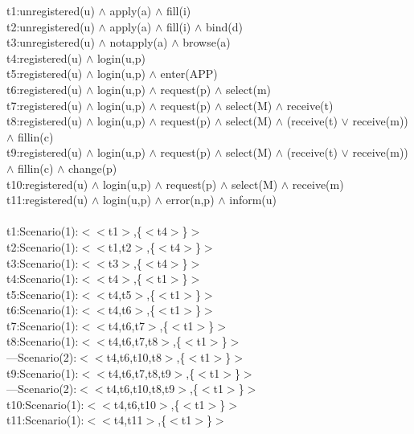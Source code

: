 \documentclass[runningheads]{llncs}
\begin{document}
t1:unregistered(u) $\wedge$ apply(a) $\wedge$ fill(i)\\
t2:unregistered(u) $\wedge$ apply(a) $\wedge$ fill(i) $\wedge$ bind(d)\\
t3:unregistered(u) $\wedge$ notapply(a) $\wedge$ browse(a)\\
t4:registered(u) $\wedge$ login(u,p)\\
t5:registered(u) $\wedge$ login(u,p) $\wedge$ enter(APP)\\
t6:registered(u) $\wedge$ login(u,p) $\wedge$ request(p) $\wedge$ select(m)\\
t7:registered(u) $\wedge$ login(u,p) $\wedge$ request(p) $\wedge$ select(M) $\wedge$ receive(t)\\
t8:registered(u) $\wedge$ login(u,p) $\wedge$ request(p) $\wedge$ select(M) $\wedge$ (receive(t) $\vee$ receive(m)) $\wedge$ fillin(c)\\
t9:registered(u) $\wedge$ login(u,p) $\wedge$ request(p) $\wedge$ select(M) $\wedge$ (receive(t) $\vee$ receive(m)) $\wedge$ fillin(c) $\wedge$ change(p)\\
t10:registered(u) $\wedge$ login(u,p) $\wedge$ request(p) $\wedge$ select(M) $\wedge$ receive(m)\\
t11:registered(u) $\wedge$ login(u,p) $\wedge$ error(n,p) $\wedge$ inform(u)\\
\\
t1:Scenario(1):$<$$<$t1$>$,\{$<$t4$>$\}$>$\\
t2:Scenario(1):$<$$<$t1,t2$>$,\{$<$t4$>$\}$>$\\
t3:Scenario(1):$<$$<$t3$>$,\{$<$t4$>$\}$>$\\
t4:Scenario(1):$<$$<$t4$>$,\{$<$t1$>$\}$>$\\
t5:Scenario(1):$<$$<$t4,t5$>$,\{$<$t1$>$\}$>$\\
t6:Scenario(1):$<$$<$t4,t6$>$,\{$<$t1$>$\}$>$\\
t7:Scenario(1):$<$$<$t4,t6,t7$>$,\{$<$t1$>$\}$>$\\
t8:Scenario(1):$<$$<$t4,t6,t7,t8$>$,\{$<$t1$>$\}$>$\\
---Scenario(2):$<$$<$t4,t6,t10,t8$>$,\{$<$t1$>$\}$>$\\
t9:Scenario(1):$<$$<$t4,t6,t7,t8,t9$>$,\{$<$t1$>$\}$>$\\
---Scenario(2):$<$$<$t4,t6,t10,t8,t9$>$,\{$<$t1$>$\}$>$\\
t10:Scenario(1):$<$$<$t4,t6,t10$>$,\{$<$t1$>$\}$>$\\
t11:Scenario(1):$<$$<$t4,t11$>$,\{$<$t1$>$\}$>$\\
\\
\end{document}
